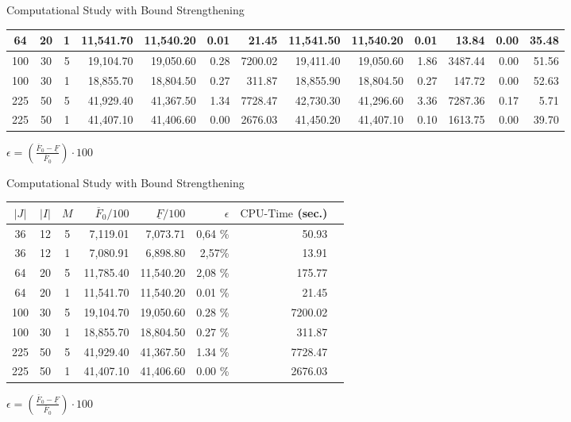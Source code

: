 \documentclass[xcolor=dvipsnames,aspectratio=169, handout, mathserif]{beamer}
\begin{document}
\begin{frame}{Computational Study with Bound Strengthening}
\begin{table}[]
{\begin{center}
\begin{tabular}{cccrrrr|rrrr|rr}
64 & 20 & 1 & 11,541.70 & 11,540.20 & 0.01 & 21.45 & 11,541.50 & 11,540.20 & 0.01 & 13.84 & 0.00 & 35.48 \\ \midrule
100 & 30 & 5 & 19,104.70 & 19,050.60 & 0.28 & 7200.02 & 19,411.40 & 19,050.60 & 1.86 & 3487.44 & 0.00 & 51.56 \\
100 & 30 & 1 & 18,855.70 & 18,804.50 & 0.27 & 311.87 & 18,855.90 & 18,804.50 & 0.27 & 147.72 & 0.00 & 52.63 \\ \midrule
225 & 50 & 5 & 41,929.40 & 41,367.50 & 1.34 & 7728.47 & 42,730.30 & 41,296.60 & 3.36 & 7287.36 & 0.17 & 5.71 \\
225 & 50 & 1 & 41,407.10 & 41,406.60 & 0.00 & 2676.03 & 41,450.20 & 41,407.10 & 0.10 & 1613.75 & 0.00 & 39.70 \\ \bottomrule
    \end{tabular}
\end{center}
}
\end{table}
$\epsilon=\left(\frac{\overline{F}_0-\underline{F}}{\overline{F}_0} \right) \cdot 100$
\end{frame}


\begin{frame}{Computational Study with Bound Strengthening}
\begin{center}
    \small
    \begin{tabular}{cccrrrrr}
    \toprule
        $|J|$ & $|I|$ & $M$ & $\overline{F}_0/100$ & $\underline{F}/100$ & $\epsilon$ &  $\text{CPU-Time}$ (sec.)  \\ \midrule
        36 & 12 & 5 & 7,119.01 &7,073.71 & 0,64 \%  & 50.93 \\
        36 & 12 & 1 & 7,080.91 & 6,898.80 & 2,57\%   & 13.91  \\ \midrule
        64 & 20 & 5 & 11,785.40 & 11,540.20 & 2,08 \%  & 175.77  \\
        64 & 20 & 1 & 11,541.70 & 11,540.20 & 0.01 \% & 21.45 \\ \midrule
        100 & 30 & 5 & 19,104.70 & 19,050.60 & 0.28 \%  & 7200.02 \\
        100 & 30 & 1 & 18,855.70 & 18,804.50 & 0.27 \%  & 311.87 \\ \midrule 
        225 & 50 & 5 & 41,929.40 & 41,367.50 & 1.34 \%  & 7728.47  \\
        225 & 50 & 1 & 41,407.10 & 41,406.60 & 0.00 \%  & 2676.03  \\ \bottomrule
    \end{tabular}
\end{center}
$\epsilon=\left(\frac{\overline{F}_0-\underline{F}}{\overline{F}_0} \right) \cdot 100$
\end{frame}
\end{document}
